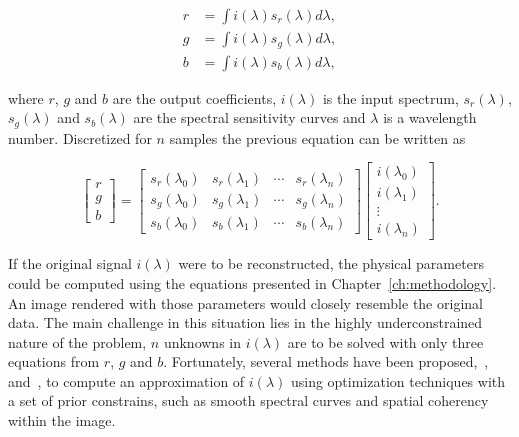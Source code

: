 \begin{equation}
\begin{split}
r &= \int i(\lambda) s_r(\lambda) d \lambda, \\
g &= \int i(\lambda) s_g(\lambda) d \lambda, \\
b &= \int i(\lambda) s_b(\lambda) d \lambda,
\end{split}
\label{eq:spectrum_collapse_cont}
\end{equation}

where $r$, $g$ and $b$ are the output coefficients, $i(\lambda)$ is the input spectrum, $s_r(\lambda)$, $s_g(\lambda)$ and $s_b(\lambda)$ are the spectral sensitivity curves and $\lambda$ is a wavelength number.
Discretized for $n$ samples the previous equation can be written as  

\begin{equation}
\begin{bmatrix}
r \\
g \\
b
\end{bmatrix}
= 
\begin{bmatrix}
s_r(\lambda_0) & s_r(\lambda_1) & \cdots & s_r(\lambda_n) \\
s_g(\lambda_0) & s_g(\lambda_1) & \cdots & s_g(\lambda_n) \\
s_b(\lambda_0) & s_b(\lambda_1) & \cdots & s_b(\lambda_n) 
\end{bmatrix}
\begin{bmatrix}
i(\lambda_0) \\
i(\lambda_1) \\
\vdots \\
i(\lambda_n) 
\end{bmatrix}.
\label{eq:spectrum_collapse_disc}
\end{equation}

If the original signal $i(\lambda)$ were to be reconstructed, the physical parameters could be computed using the equations presented in Chapter~\ref{ch:methodology}.
An image rendered with those parameters would closely resemble the original data.
The main challenge in this situation lies in the highly underconstrained nature of the problem, $n$ unknowns in $i(\lambda)$ are to be solved with only three equations from $r$, $g$ and $b$.
Fortunately, several methods have been proposed,~\cite{Smits:1999},~\cite{Sun2001} and~\cite{Drew:2003}, to compute an approximation of $i(\lambda)$ using optimization techniques with a set of prior constrains, such as smooth spectral curves and spatial coherency within the image.

